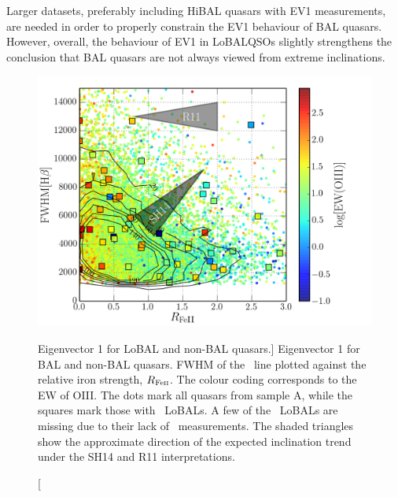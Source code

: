Larger datasets, preferably including HiBAL quasars with EV1 measurements, 
are needed in order to properly constrain the EV1 behaviour of BAL quasars.
However, overall, the behaviour of EV1 in LoBALQSOs slightly 
strengthens the conclusion that BAL quasars are not always viewed from 
extreme inclinations.

\begin{figure}
\centering
\includegraphics[width=1.0\textwidth]{figures/ewpaper/ev1.png}
\caption
[Eigenvector 1 for LoBAL and non-BAL quasars.]
{
Eigenvector 1 for BAL and non-BAL quasars. 
FWHM of the \hb\ line plotted against the relative
iron strength, $R_{{\rm Fe \textsc{ii}}}$. The colour coding
corresponds to the EW of OIII. The dots mark all quasars from
sample A, while the squares mark those with \mgii\ LoBALs. 
A few of the \mgii\ LoBALs are missing due to their lack of \fwh\ 
measurements. The shaded triangles show the approximate 
direction of the expected inclination
trend under the SH14 and R11 interpretations.
}
\label{fig:bal_ev1}
\end{figure}

